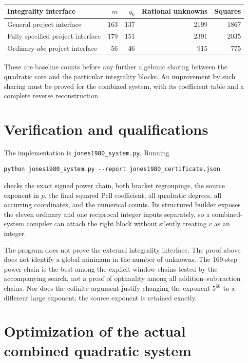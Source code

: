 \documentclass[11pt]{article}
\begin{document}
\begin{center}
\begin{tabular}{lrrrr}
\toprule
Integrality interface & \(m\)&\(q_0\)& Rational unknowns & Squares\\
\midrule
General project interface &163&137&2199&1867\\
Fully specified project interface &179&151&2391&2035\\
Ordinary-\(abc\) project interface &56&46&915&775\\
\bottomrule
\end{tabular}
\end{center}
These are baseline counts before any further algebraic sharing between
the quadratic core and the particular integrality blocks. An improvement
by such sharing must be proved for the combined system, with its
coefficient table and a complete reverse reconstruction.

\section{Verification and qualifications}
The implementation is \texttt{jones1980\_system.py}. Running
\begin{verbatim}
python jones1980_system.py --report jones1980_certificate.json
\end{verbatim}
checks the exact signed power chain, both bracket regroupings, the
source exponent in \(p\), the final squared Pell coefficient, all
quadratic degrees, all occurring coordinates, and the numerical counts.
Its structured builder exposes the eleven ordinary and one reciprocal
integer inputs separately, so a combined-system compiler can attach the
right block without silently treating \(v\) as an integer.

The program does not prove the external integrality interface. The proof
above does not identify a global minimum in the number of unknowns. The
169-step power chain is the best among the explicit window chains tested
by the accompanying search, not a proof of optimality among all
addition--subtraction chains. Nor does the cofinite argument justify
changing the exponent \(5^{60}\) to a different large exponent; the
source exponent is retained exactly.

\section{Optimization of the actual combined quadratic system}\label{sec:combined}
\end{document}
